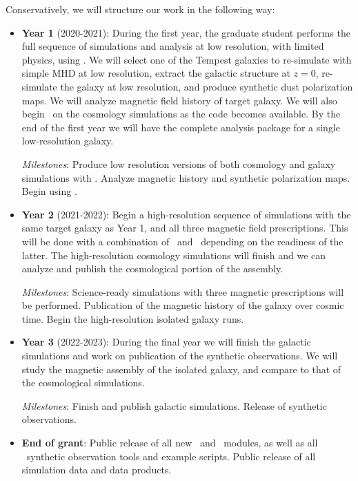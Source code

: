 Conservatively, we will structure our work in the following way:
\begin{itemize}
\item{\textbf{Year 1} (2020-2021): 
    During the first year, the graduate student performs the full sequence of simulations and analysis
    at low resolution, with limited physics, using \enzo.  We will select one of the Tempest
    galaxies to re-simulate with simple MHD at low resolution, extract the
    galactic structure at $z=0$, re-simulate the galaxy at low resolution, and
    produce synthetic dust polarization maps.  We will analyze magnetic field history of
    target galaxy.  We will also begin \enzoe\ on the cosmology simulations as
    the code becomes available.  By the end of the first year we will have the
    complete analysis package for a single low-resolution galaxy.  

{\em Milestones}: Produce low resolution versions of both cosmology and galaxy
simulations with \enzo.  Analyze magnetic history and synthetic polarization maps.  Begin using \enzoe.}

\item{\textbf{Year 2} (2021-2022): 
    Begin a high-resolution sequence of simulations with the same target galaxy
    as Year 1, and all three magnetic field prescriptions.  This will be done
    with a combination of \enzo\ and \enzoe\ depending on the readiness of the
    latter. The high-resolution cosmology simulations will finish and we can
    analyze and publish the cosmological portion of the assembly.

{\em Milestones}: 
Science-ready simulations with three magnetic prescriptions will be performed. Publication of the
magnetic history of the galaxy over cosmic time.  Begin the high-resolution
isolated galaxy runs.
}

\item{\textbf{Year 3} (2022-2023): 
    During the final year we will finish the galactic simulations and work on publication of the synthetic
    observations. We will study the magnetic assembly of the isolated galaxy,
    and compare to that of the cosmological simulations.

{\em Milestones}: Finish and publish galactic simulations.  Release of synthetic observations.  
    }

\item{\textbf{End of grant}: Public release of all new \enzo\ and \enzoe\ modules,
as well as all \yt\ synthetic observation tools and example scripts.
Public release of all simulation data and data products.}

\end{itemize}

\vspace{-3mm}
